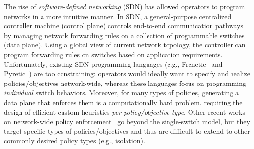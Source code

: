 

The rise of \emph{software-defined networking} (SDN) has allowed
operators to program networks in a more intuitive manner. In SDN, a
general-purpose centralized controller machine (control plane)
controls end-to-end communication pathways by managing network
forwarding rules on a collection of programmable switches (data
plane). Using a global view of current network topology, the
controller can program forwarding rules on switches based on
application requirements.
Unfortunately, existing SDN programming languages (e.g.,
Frenetic~\cite{frenetic} and Pyretic~\cite{pyretic}) are too
constraining: operators would ideally want to specify and realize
policies/objectives network-wide, whereas these languages focus on programming
{\em individual} switch behaviors.  Moreover, for many types of
policies, generating a data plane that enforces them is a
computationally hard problem, requiring the design of efficient custom
heuristics {\em per policy/objective type}. Other recent works on
network-wide policy enforcement~\cite{merlin,simple} go beyond the
single-switch model, but they target specific types of policies/objectives and
thus are difficult to extend to other commonly desired policy types
(e.g., isolation).







